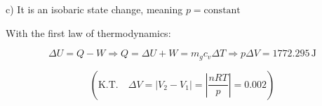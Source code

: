 c) It is an isobaric state change, meaning \( p = \text{constant} \)

With the first law of thermodynamics:

\[
\Delta U = Q - W \Rightarrow Q = \Delta U + W = m_g c_v \Delta T \Rightarrow p \Delta V = 1772.295 \, \text{J}
\]

\[
\left( \text{K.T.} \quad \Delta V = |V_2 - V_1| = \left| \frac{nRT}{p} \right| = 0.002 \right)
\]